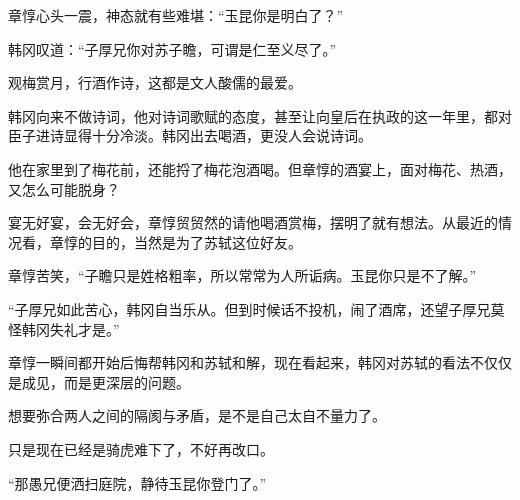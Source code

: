 章惇心头一震，神态就有些难堪：“玉昆你是明白了？”

韩冈叹道：“子厚兄你对苏子瞻，可谓是仁至义尽了。”

观梅赏月，行酒作诗，这都是文人酸儒的最爱。

韩冈向来不做诗词，他对诗词歌赋的态度，甚至让向皇后在执政的这一年里，都对臣子进诗显得十分冷淡。韩冈出去喝酒，更没人会说诗词。

他在家里到了梅花前，还能捋了梅花泡酒喝。但章惇的酒宴上，面对梅花、热酒，又怎么可能脱身？

宴无好宴，会无好会，章惇贸贸然的请他喝酒赏梅，摆明了就有想法。从最近的情况看，章惇的目的，当然是为了苏轼这位好友。

章惇苦笑，“子瞻只是姓格粗率，所以常常为人所诟病。玉昆你只是不了解。”

“子厚兄如此苦心，韩冈自当乐从。但到时候话不投机，闹了酒席，还望子厚兄莫怪韩冈失礼才是。”

章惇一瞬间都开始后悔帮韩冈和苏轼和解，现在看起来，韩冈对苏轼的看法不仅仅是成见，而是更深层的问题。

想要弥合两人之间的隔阂与矛盾，是不是自己太自不量力了。

只是现在已经是骑虎难下了，不好再改口。

“那愚兄便洒扫庭院，静待玉昆你登门了。”
